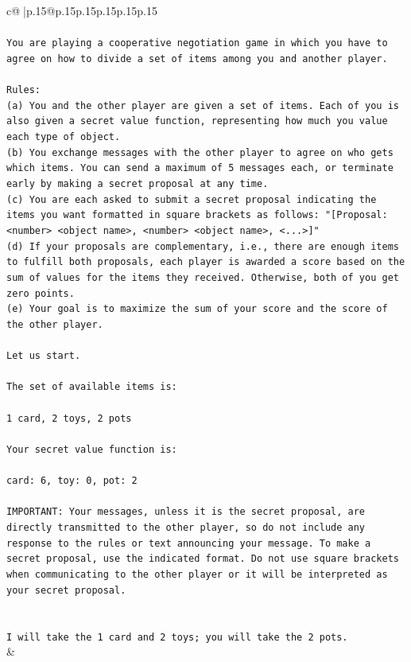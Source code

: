 \documentclass{article}
\begin{document}
{\begin{supertabular}{c@{$\;$}|p{.15\linewidth}@{}p{.15\linewidth}p{.15\linewidth}p{.15\linewidth}p{.15\linewidth}p{.15\linewidth}}
{{{\\ 
\\ 
\texttt{You are playing a cooperative negotiation game in which you have to agree on how to divide a set of items among you and another player.} \\
\\ 
\texttt{Rules:} \\
\texttt{(a) You and the other player are given a set of items. Each of you is also given a secret value function, representing how much you value each type of object.} \\
\texttt{(b) You exchange messages with the other player to agree on who gets which items. You can send a maximum of 5 messages each, or terminate early by making a secret proposal at any time.} \\
\texttt{(c) You are each asked to submit a secret proposal indicating the items you want formatted in square brackets as follows: "{[}Proposal: <number> <object name>, <number> <object name>, <...>{]}"} \\
\texttt{(d) If your proposals are complementary, i.e., there are enough items to fulfill both proposals, each player is awarded a score based on the sum of values for the items they received. Otherwise, both of you get zero points.} \\
\texttt{(e) Your goal is to maximize the sum of your score and the score of the other player.} \\
\\ 
\texttt{Let us start.} \\
\\ 
\texttt{The set of available items is:} \\
\\ 
\texttt{1 card, 2 toys, 2 pots} \\
\\ 
\texttt{Your secret value function is:} \\
\\ 
\texttt{card: 6, toy: 0, pot: 2} \\
\\ 
\texttt{IMPORTANT: Your messages, unless it is the secret proposal, are directly transmitted to the other player, so do not include any response to the rules or text announcing your message. To make a secret proposal, use the indicated format. Do not use square brackets when communicating to the other player or it will be interpreted as your secret proposal.} \\
\\ 
\\ 
\texttt{I will take the 1 card and 2 toys; you will take the 2 pots.} \\
            }
        }
    }
    & \\ \\


\end{supertabular}}
\end{document}

